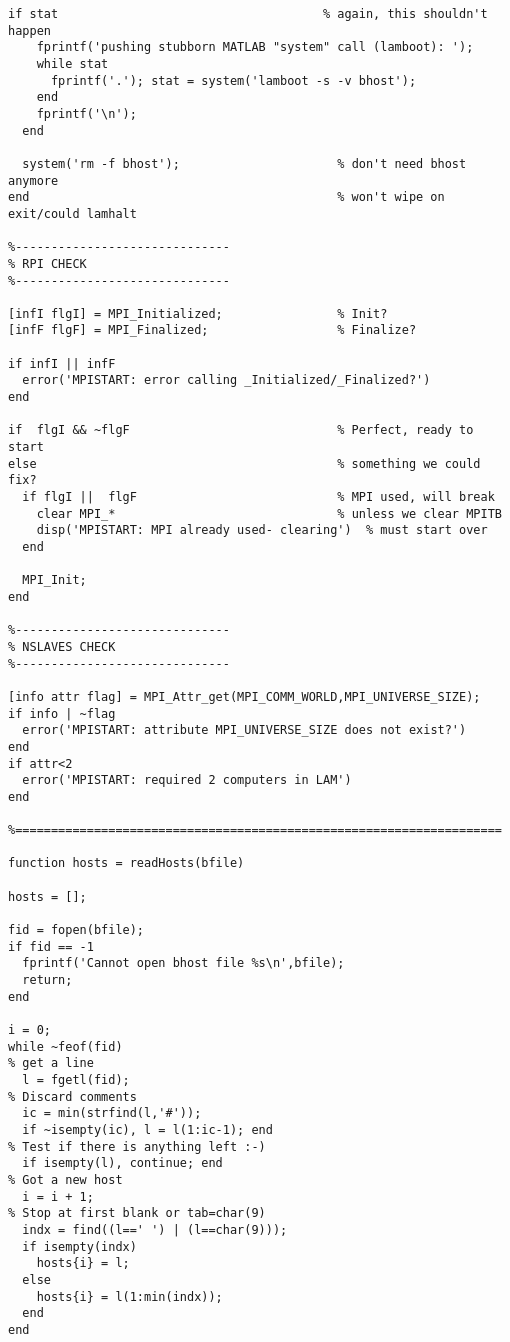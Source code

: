 \begin{lstlisting}[linerange={1-1,16-325}]
  if stat                                     % again, this shouldn't happen
    fprintf('pushing stubborn MATLAB "system" call (lamboot): ');
    while stat
      fprintf('.'); stat = system('lamboot -s -v bhost');
    end
    fprintf('\n');
  end

  system('rm -f bhost');                      % don't need bhost anymore
end                                           % won't wipe on exit/could lamhalt

%------------------------------
% RPI CHECK
%------------------------------

[infI flgI] = MPI_Initialized;                % Init?
[infF flgF] = MPI_Finalized;                  % Finalize?

if infI || infF
  error('MPISTART: error calling _Initialized/_Finalized?')
end
 
if  flgI && ~flgF                             % Perfect, ready to start
else                                          % something we could fix?
  if flgI ||  flgF                            % MPI used, will break
    clear MPI_*                               % unless we clear MPITB
    disp('MPISTART: MPI already used- clearing')  % must start over
  end
                                                                                
  MPI_Init;
end

%------------------------------
% NSLAVES CHECK
%------------------------------

[info attr flag] = MPI_Attr_get(MPI_COMM_WORLD,MPI_UNIVERSE_SIZE);
if info | ~flag
  error('MPISTART: attribute MPI_UNIVERSE_SIZE does not exist?')
end
if attr<2
  error('MPISTART: required 2 computers in LAM')
end

%====================================================================

function hosts = readHosts(bfile)

hosts = [];

fid = fopen(bfile);
if fid == -1
  fprintf('Cannot open bhost file %s\n',bfile);
  return;
end

i = 0;
while ~feof(fid)
% get a line
  l = fgetl(fid);
% Discard comments
  ic = min(strfind(l,'#'));
  if ~isempty(ic), l = l(1:ic-1); end
% Test if there is anything left :-)
  if isempty(l), continue; end
% Got a new host  
  i = i + 1;
% Stop at first blank or tab=char(9)
  indx = find((l==' ') | (l==char(9)));
  if isempty(indx)
    hosts{i} = l;
  else
    hosts{i} = l(1:min(indx));
  end
end


\end{lstlisting}
